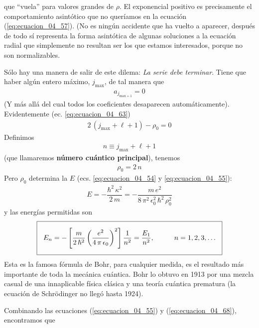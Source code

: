 que \enquote{vuela} para valores grandes de $\rho$. El exponencial positivo es precisamente el comportamiento asintótico que no queríamos en la ecuación (\ref{eq:ecuacion_04_57}). (No es ningún accidente que ha vuelto a aparecer, después de todo sí representa la forma asintótica de algunas soluciones a la ecuación radial que simplemente no resultan ser los que estamos interesados, porque no son normalizables.
\par
Sólo hay una manera de salir de este dilema: \emph{La serie debe terminar}. Tiene que haber algún entero máximo, $j_{\text{max}}$, de tal manera que
\begin{align}
a_{j_{\text{max} + 1}} = 0
\label{eq:ecuacion_04_66}
\end{align}
(Y más allá del cual todos los coeficientes desaparecen automáticamente). Evidentemente (ec. \ref{eq:ecuacion_04_63})
\begin{align*}
2 \, (j_{\text{max}} + \ell + 1) - \rho_{0} = 0
\end{align*}
Definimos
\begin{align}
n \equiv j_{\text{max}} + \ell + 1
\label{eq:ecuacion_04_67}
\end{align}
(que llamaremos \textbf{número cuántico principal}), tenemos
\begin{align}
\rho_{0} = 2 \, n
\label{eq:ecuacion_04_68}
\end{align}
Pero $\rho_{0}$ determina la $E$ (ecs. \ref{eq:ecuacion_04_54} y \ref{eq:ecuacion_04_55}):
\begin{align}
E = - \dfrac{\hbar^{2} \, \kappa^{2}}{2 \, m} = - \dfrac{m \, e^{2}}{8 \, \pi^{2} \, \epsilon_{0}^{2} \, \hbar^{2} \, \rho_{0}^{2}}
\label{eq:ecuacion_04_69}
\end{align}
y las energías permitidas son
\begin{align}
\setlength{\fboxsep}{3\fboxsep}\boxed{
E_{n} = - \left[ \dfrac{m}{2 \, \hbar^{2}} \left( \dfrac{e^{2}}{4 \, \pi \, \epsilon_{0}} \right)^{2} \right] \dfrac{1}{n^{2}} = \dfrac{E_{1}}{n^{2}}, \hspace{1cm} n = 1, 2, 3, \ldots}
\label{eq:ecuacion_04_70}
\end{align}
Esta es la famosa fórmula de Bohr, para cualquier medida, es el resultado más importante de toda la mecánica cuántica. Bohr lo obtuvo en 1913 por una mezcla casual de una innaplicable física clásica y una teoría cuántica prematura (la ecuación de Schrödinger no llegó hasta 1924).
\par
Combinando las ecuaciones (\ref{eq:ecuacion_04_55}) y (\ref{eq:ecuacion_04_68}), encontramos que
